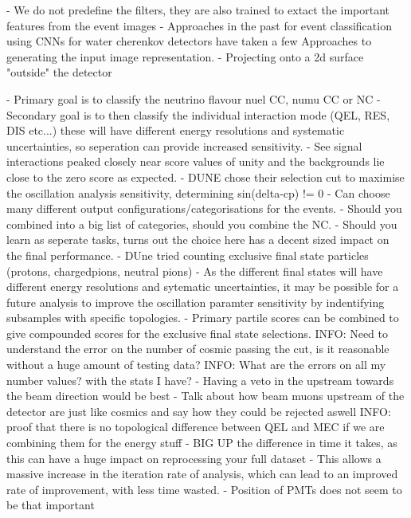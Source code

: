 - We do not predefine the filters, they are also trained to extact the important features from the event images
- Approaches in the past for event classification using CNNs for water cherenkov detectors have taken a few Approaches to generating the input image representation.
- Projecting onto a 2d surface "outside" the detector

- Primary goal is to classify the neutrino flavour nuel CC, numu CC or NC
- Secondary goal is to then classify the individual interaction mode (QEL, RES, DIS etc...) these will have different energy resolutions and systematic uncertainties, so seperation can provide increased sensitivity.
- See signal interactions peaked closely near score values of unity and the backgrounds lie close to the zero score as expected.
- DUNE chose their selection cut to maximise the oscillation analysis sensitivity, determining sin(delta-cp) != 0
- Can choose many different output configurations/categorisations for the events.
- Should you combined into a big list of categories, should you combine the NC.
- Should you learn as seperate tasks, turns out the choice here has a decent sized impact on the final performance.
- DUne tried counting exclusive final state particles (protons, chargedpions, neutral pions)
- As the different final states will have different energy resolutions and sytematic uncertainties, it may be possible for a future analysis to improve the oscillation paramter sensitivity by indentifying subsamples with specific topologies.
- Primary partile scores can be combined to give compounded scores for the exclusive final state selections.
INFO: Need to understand the error on the number of cosmic passing the cut, is it reasonable without a huge amount of testing data?
INFO: What are the errors on all my number values? with the stats I have?
- Having a veto in the upstream towards the beam direction would be best
- Talk about how beam muons upstream of the detector are just like cosmics and say how they could be rejected aswell
INFO: proof that there is no topological difference between QEL and MEC if we are combining them for the energy stuff
- BIG UP the difference in time it takes, as this can have a huge impact on reprocessing your full dataset
- This allows a massive increase in the iteration rate of analysis, which can lead to an improved rate of improvement, with less time wasted.
- Position of PMTs does not seem to be that important

